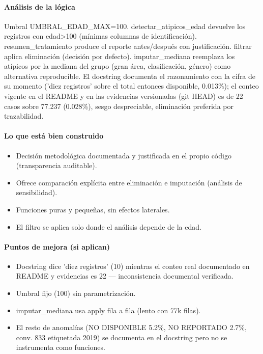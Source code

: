 \paragraph{Análisis de la lógica}
Umbral UMBRAL\_EDAD\_MAX=100. detectar\_atipicos\_edad devuelve los registros con edad>100 (mínimas columnas de identificación). resumen\_tratamiento produce el reporte antes/después con justificación. filtrar aplica eliminación (decisión por defecto). imputar\_mediana reemplaza los atípicos por la mediana del grupo (gran área, clasificación, género) como alternativa reproducible. El docstring documenta el razonamiento con la cifra de su momento ('diez registros' sobre el total entonces disponible, 0.013\%); el conteo vigente en el README y en las evidencias versionadas (git HEAD) es de 22 casos sobre 77.237 (0.028\%), sesgo despreciable, eliminación preferida por trazabilidad.

\paragraph{Lo que está bien construido}
\begin{itemize}
  \item Decisión metodológica documentada y justificada en el propio código (transparencia auditable).
  \item Ofrece comparación explícita entre eliminación e imputación (análisis de sensibilidad).
  \item Funciones puras y pequeñas, sin efectos laterales.
  \item El filtro se aplica solo donde el análisis depende de la edad.
\end{itemize}

\paragraph{Puntos de mejora (si aplican)}
\begin{itemize}
  \item Docstring dice 'diez registros' (10) mientras el conteo real documentado en README y evidencias es 22 --- inconsistencia documental verificada.
  \item Umbral fijo (100) sin parametrización.
  \item imputar\_mediana usa apply fila a fila (lento con 77k filas).
  \item El resto de anomalías (NO DISPONIBLE 5.2\%, NO REPORTADO 2.7\%, conv. 833 etiquetada 2019) se documenta en el docstring pero no se instrumenta como funciones.
\end{itemize}

